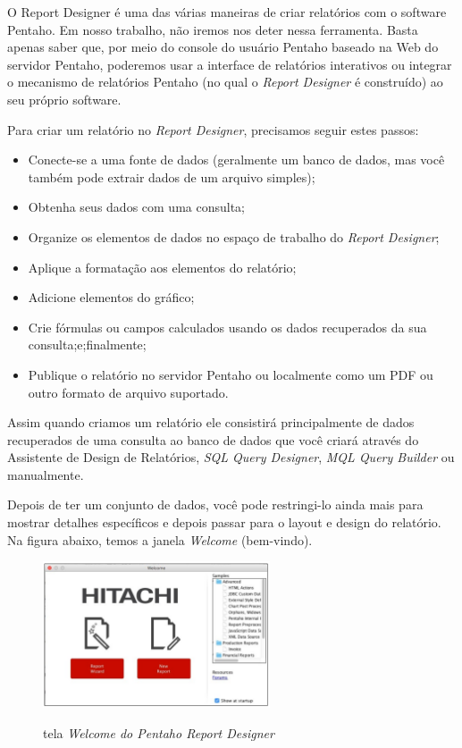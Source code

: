 O Report Designer \'{e} uma das v\'{a}rias maneiras de criar relat\'{o}rios com o software 
Pentaho. Em nosso trabalho, n\~{a}o iremos nos deter nessa ferramenta. Basta apenas saber 
que, por meio do console do usu\'{a}rio Pentaho baseado na Web do servidor Pentaho, 
poderemos usar a interface de relat\'orios interativos ou integrar o mecanismo de relat\'{o}rios 
Pentaho (no qual o \textit{Report Designer} \'{e} constru\'{i}do) ao seu pr\'{o}prio software.

Para criar um relat\'orio no \textit{Report Designer}, precisamos seguir estes passos:

\begin{itemize}
    \item Conecte-se a uma fonte de dados (geralmente um banco de dados, mas você tamb\'{e}m pode extrair dados de um arquivo simples);
    \item Obtenha seus dados com uma consulta;
    \item Organize os elementos de dados no espa\c{c}o de trabalho do \textit{Report Designer};
    \item Aplique a formata\c{c}\~{a}o aos elementos do relat\'orio;
    \item Adicione elementos do gr\'{a}fico;
    \item Crie f\'ormulas ou campos calculados usando os dados recuperados da sua consulta;e;finalmente;
    \item Publique o relat\'orio no servidor Pentaho ou localmente como um PDF ou outro formato de arquivo suportado. 
\end{itemize}

Assim quando criamos um relat\'orio ele consistir\'{a} principalmente de dados recuperados de uma consulta ao banco de dados que você criar\'{a} atrav\'{e}s do Assistente de Design de Relat\'orios, \textit{SQL Query Designer}, \textit{MQL Query Builder} ou manualmente. 

Depois de ter um conjunto de dados, você pode restringi-lo ainda mais para mostrar detalhes espec\'{i}ficos e depois passar para o layout e design do relat\'orio. Na figura abaixo, temos a janela \textit{Welcome} (bem-vindo).

\begin{figure}[H]
	\vspace*{0,2cm}
    \centering
    \caption{tela \textit{Welcome do Pentaho Report Designer}}
    \includegraphics[width=0.6\textwidth]{./04-figuras/figura-welcome-prd}
    \label{fig:ilustfigwelcomeprd}
\end{figure}
\vspace*{-0,9cm}
{\raggedright {}} \\
 
